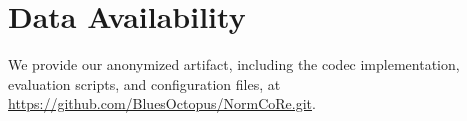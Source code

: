 \section{Data Availability}

We provide our anonymized artifact, including the codec implementation,
evaluation scripts, and configuration files, at
\url{https://github.com/BluesOctopus/NormCoRe.git}.
